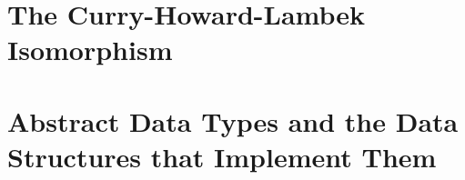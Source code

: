 




\toclineskip
\section{The Curry-Howard-Lambek Isomorphism}







\toclineskip
\section{Abstract Data Types and the Data Structures that Implement Them}


